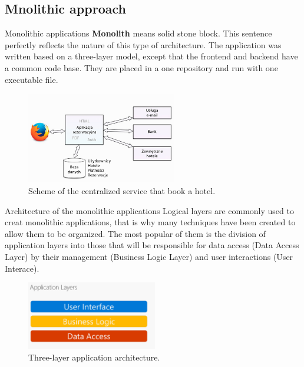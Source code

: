 \documentclass{beamer}
\begin{document}
	\subsection{Mnolithic approach}
	\begin{frame}{Monolithic applications}
		\textbf{Monolith} means solid stone block. This sentence perfectly reflects the nature of this type of architecture. The application was written based on a three-layer model, except that the frontend and backend have a common code base. They are placed in a one repository and run with one executable file.
		\begin{figure}[h!]
			\centering
			\includegraphics[height=4cm]{Pictures/scentralizowanaArchitektura.png}
			\caption{Scheme of the centralized service that book a hotel.}	
			\label{fig:mono}
		\end{figure}
	\end{frame}
	
	\begin{frame}{Architecture of the monolithic applications}
		Logical layers are commonly used to creat monolithic applications, that is why many techniques have been created to allow them to be organized. The most popular of them is the division of application layers into those that will be responsible for data access (Data Access Layer) by their management (Business Logic Layer) and user interactions (User Interace).
		\begin{figure}[h!]
			\centering
			\includegraphics[height=3cm]{Pictures/warstwyAplikacji.png}
			\caption{Three-layer application architecture.}	
			\label{fig:architekturaTroj}
		\end{figure}
	\end{frame}
	
\end{document}
